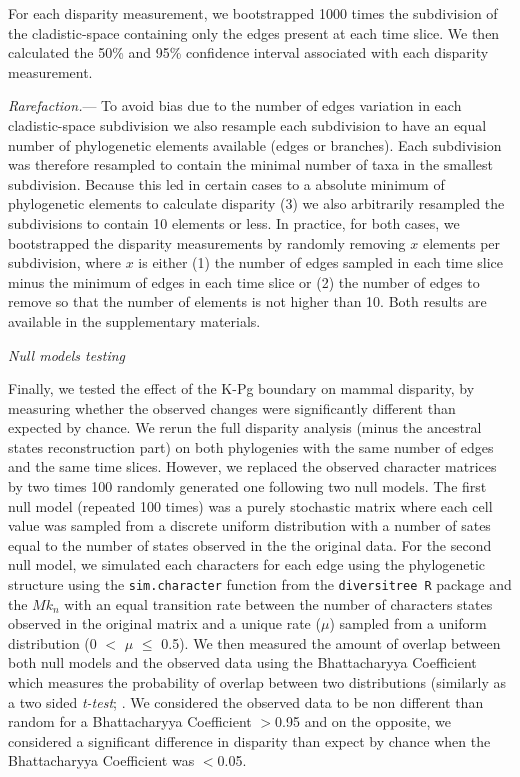 \documentclass[12pt,letterpaper]{article}
\renewcommand{\subsection}[1]{%
\bigskip
\begin{center}
\begin{large}
\normalfont\itshape #1
\end{large}
\end{center}}
\renewcommand{\subsubsection}[1]{%
\vspace{2ex}
\noindent
\textit{#1.}---}
\begin{document}
For each disparity measurement, we bootstrapped 1000 times the subdivision of the cladistic-space containing only the edges present at each time slice. We then calculated the 50\% and 95\% confidence interval associated with each disparity measurement.

\subsubsection{Rarefaction}
To avoid bias due to the number of edges variation in each cladistic-space subdivision we also resample each subdivision to have an equal number of phylogenetic elements available (edges or branches). Each subdivision was therefore resampled to contain the minimal number of taxa in the smallest subdivision. Because this led in certain cases to a absolute minimum of phylogenetic elements to calculate disparity (3) we also arbitrarily resampled the subdivisions to contain 10 elements or less. In practice, for both cases, we bootstrapped the disparity measurements by randomly removing $x$ elements per subdivision, where $x$ is either (1) the number of edges sampled in each time slice minus the minimum of edges in each time slice or (2) the number of edges to remove so that the number of elements is not higher than 10. Both results are available in the supplementary materials.

\subsection{Null models testing}
Finally, we tested the effect of the K-Pg boundary on mammal disparity, by measuring whether the observed changes were significantly different than expected by chance. We rerun the full disparity analysis (minus the ancestral states reconstruction part) on both phylogenies with the same number of edges and the same time slices. However, we replaced the observed character matrices by two times 100 randomly generated one following two null models. The first null model (repeated 100 times) was a purely stochastic matrix where each cell value was sampled from a discrete uniform distribution with a number of sates equal to the number of states observed in the the original data. For the second null model, we simulated each characters for each edge using the phylogenetic structure using the \texttt{sim.character} function from the \texttt{diversitree R} package \citep{fitzjohndiversitree2012} and the $Mk_n$ \citep{lewisa2001} with an equal transition rate between the number of characters states observed in the original matrix and a unique rate ($\mu$) sampled from a uniform distribution (0 $<$ $\mu$  $\leq$ 0.5). 
We then measured the amount of overlap between both null models and the observed data using the Bhattacharyya Coefficient \citep{Bhattacharyya} which measures the probability of overlap between two distributions (similarly as a two sided \textit{t-test}; \citealt{GuillermeCooper}. We considered the observed data to be non different than random for a Bhattacharyya Coefficient $>$0.95 and on the opposite, we considered a significant difference in disparity than expect by chance when the Bhattacharyya Coefficient was $<$0.05.
\end{document}

